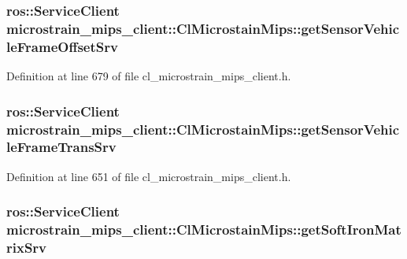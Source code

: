 \subsubsection[{\texorpdfstring{get\+Sensor\+Vehicle\+Frame\+Offset\+Srv}{getSensorVehicleFrameOffsetSrv}}]{\setlength{\rightskip}{0pt plus 5cm}ros\+::\+Service\+Client microstrain\+\_\+mips\+\_\+client\+::\+Cl\+Microstain\+Mips\+::get\+Sensor\+Vehicle\+Frame\+Offset\+Srv\hspace{0.3cm}{\ttfamily [protected]}}\hypertarget{classmicrostrain__mips__client_1_1ClMicrostainMips_a95b89db0b03cffdb9b81cf1126e9e477}{}\label{classmicrostrain__mips__client_1_1ClMicrostainMips_a95b89db0b03cffdb9b81cf1126e9e477}


Definition at line 679 of file cl\+\_\+microstrain\+\_\+mips\+\_\+client.\+h.

\subsubsection[{\texorpdfstring{get\+Sensor\+Vehicle\+Frame\+Trans\+Srv}{getSensorVehicleFrameTransSrv}}]{\setlength{\rightskip}{0pt plus 5cm}ros\+::\+Service\+Client microstrain\+\_\+mips\+\_\+client\+::\+Cl\+Microstain\+Mips\+::get\+Sensor\+Vehicle\+Frame\+Trans\+Srv\hspace{0.3cm}{\ttfamily [protected]}}\hypertarget{classmicrostrain__mips__client_1_1ClMicrostainMips_a9f255bbd963a48afee1b042ef9ba3065}{}\label{classmicrostrain__mips__client_1_1ClMicrostainMips_a9f255bbd963a48afee1b042ef9ba3065}


Definition at line 651 of file cl\+\_\+microstrain\+\_\+mips\+\_\+client.\+h.

\subsubsection[{\texorpdfstring{get\+Soft\+Iron\+Matrix\+Srv}{getSoftIronMatrixSrv}}]{\setlength{\rightskip}{0pt plus 5cm}ros\+::\+Service\+Client microstrain\+\_\+mips\+\_\+client\+::\+Cl\+Microstain\+Mips\+::get\+Soft\+Iron\+Matrix\+Srv\hspace{0.3cm}{\ttfamily [protected]}}\hypertarget{classmicrostrain__mips__client_1_1ClMicrostainMips_ad4ba8fa3476b9d63d9772aebe1295e0e}{}\label{classmicrostrain__mips__client_1_1ClMicrostainMips_ad4ba8fa3476b9d63d9772aebe1295e0e}


